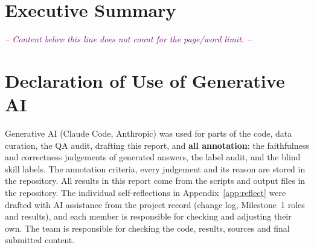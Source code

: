 \documentclass[a4paper, table, 11pt]{article}
\begin{document}
\newpage


\section*{Executive Summary}

\newpage

\tableofcontents\thispagestyle{empty}
\newpage

\listoffigures\thispagestyle{empty}
\newpage

\listoftables\thispagestyle{empty}
\newpage









\clearpage


\begin{center}
    \noindent \textcolor{purple}{\emph{-- Content below this line does not count for the page/word limit. --}}
\end{center}


\section*{Declaration of Use of Generative AI}
Generative AI (Claude Code, Anthropic) was used for parts of the code, data curation, the QA audit, drafting this report, and \textbf{all annotation}: the faithfulness and correctness judgements of generated answers, the label audit, and the blind skill labels. The annotation criteria, every judgement and its reason are stored in the repository. All results in this report come from the scripts and output files in the repository. The individual self-reflections in Appendix~\ref{app:reflect} were drafted with AI assistance from the project record (change log, Milestone~1 roles and results), and each member is responsible for checking and adjusting their own. The team is responsible for checking the code, results, sources and final submitted content.
\end{document}
